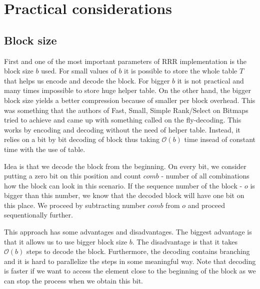 \section{Practical considerations}

\subsection{Block size}

First and one of the most important parameters of RRR implementation is the block
size $b$ used. For small values of $b$ it is possible to store the whole table
$T$ that helps us encode and decode the block. For bigger $b$ it is not practical
and many times impossible to store huge helper table. On the other hand, the bigger
block size yields a better compression because of smaller per block overhead. This was
something that the authors of Fast, Small, Simple Rank/Select on Bitmaps tried to
achieve and came up with something called on the fly-decoding. This works by encoding
and decoding without the need of helper table. Instead, it relies on a bit by bit decoding
of block thus taking $\mathcal{O}(b)$ time insead of constant time with the use of table.

Idea is that we decode the block from the beginning. On every bit, we consider putting a
zero bit on this position and count $comb$ - number of all combinations how the block can
look in this scenario. If the sequence number of the block - $o$ is bigger than this number,
we know that the decoded block will have one bit on this place. We proceed by subtracting
number $comb$ from $o$ and proceed sequentionally further.

This approach has some advantages and disadvantages. The biggest advantage is that it allows
us to use bigger block size $b$. The disadvantage is that it takes $\mathcal{O}(b)$ steps to decode the
block. Furthermore, the decoding contains branching and it is hard to parallelize the steps
in some meaningful way. Note that decoding is faster if we want to access the element
close to the beginning of the block as we can stop the process when we obtain this bit.